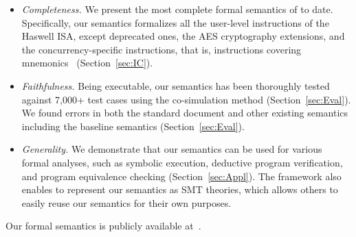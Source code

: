 \begin{itemize}
\item
\emph{Completeness.}
We present the most complete formal semantics of \ISA to date.
Specifically, our semantics formalizes all the user-level instructions of the \ISA Haswell ISA, except deprecated ones,
the AES cryptography extensions, and the concurrency-specific instructions, that is,
\currentIS{} instructions covering \currentIntel{} mnemonics~\cite{IntelManual} (Section~\ref{sec:IC}).
\item
\emph{Faithfulness.}
Being executable, our semantics has been thoroughly tested against 7,000+ test cases using the co-simulation method (Section~\ref{sec:Eval}).
We found errors in both the \ISA standard document and other existing semantics including the baseline semantics (Section~\ref{sec:Eval}).
\item
\emph{Generality.}
We demonstrate that our semantics can be used for various formal analyses, such as symbolic execution, deductive program verification, and program equivalence checking (Section~\ref{sec:Appl}).
The \K framework also enables to represent our semantics as SMT theories,
which allows others to easily reuse our semantics for their own purposes.
\end{itemize}
%
Our formal semantics is publicly available at~\cite{Suppl}.






